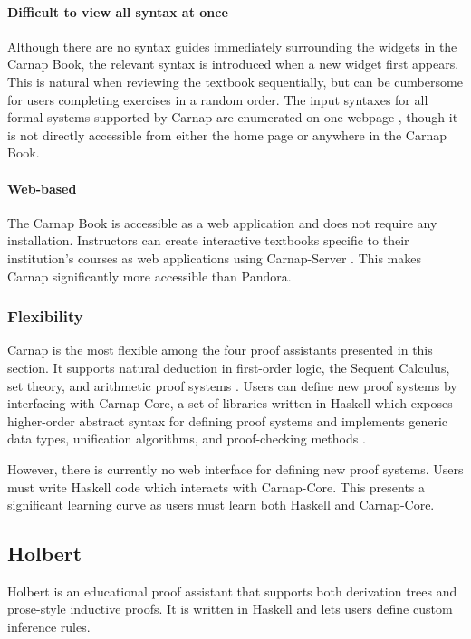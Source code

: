 \paragraph{Difficult to view all syntax at once}
Although there are no syntax guides immediately surrounding the widgets in the Carnap Book, the relevant syntax is introduced when a new widget first appears. This is natural when reviewing the textbook sequentially, but can be cumbersome for users completing exercises in a random order. The input syntaxes for all formal systems supported by Carnap are enumerated on one webpage \cite{carnap:systems}, though it is not directly accessible from either the home page or anywhere in the Carnap Book.

\paragraph{Web-based} The Carnap Book is accessible as a web application \cite{carnap:book} and does not require any installation. Instructors can create interactive textbooks specific to their institution's courses as web applications using Carnap-Server \cite{carnap:2018}. This makes Carnap significantly more accessible than Pandora.

\subsubsection{Flexibility}
Carnap is the most flexible among the four proof assistants presented in this section. It supports natural deduction in first-order logic, the Sequent Calculus, set theory, and arithmetic proof systems \cite{carnap:systems}. Users can define new proof systems by interfacing with Carnap-Core, a set of libraries written in Haskell which exposes higher-order abstract syntax for defining proof systems and implements generic data types, unification algorithms, and proof-checking methods \cite{carnap:2018}.

However, there is currently no web interface for defining new proof systems. Users must write Haskell code which interacts with Carnap-Core. This presents a significant learning curve as users must learn both Haskell and Carnap-Core.

\subsection{Holbert}
Holbert \cite{oconnor:2022} is an educational proof assistant that supports both derivation trees and prose-style inductive proofs. It is written in Haskell and lets users define custom inference rules.

